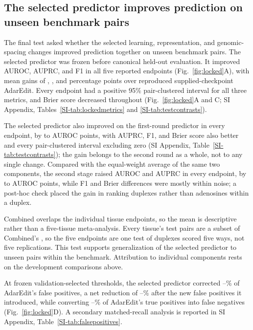 \documentclass[9pt,twocolumn,twoside]{pnas-new}
\newcommand{\SIref}[1]{\ref*{SI-#1}}
\begin{document}
\subsection*{The selected predictor improves prediction on unseen benchmark pairs}

The final test asked whether the selected learning, representation, and genomic-spacing changes improved prediction together on unseen benchmark pairs. The selected predictor was frozen before canonical held-out evaluation. It improved AUROC, AUPRC, and F1 in all five reported endpoints (Fig.~\ref{fig:locked}A), with mean gains of \MacroDeltaAUROCPoints{}, \MacroDeltaAUPRCPoints{}, and \MacroDeltaFOnePoints{} percentage points over reproduced supplied-checkpoint AdarEdit. Every endpoint had a positive 95\% pair-clustered interval for all three metrics, and Brier score decreased throughout (Fig.~\ref{fig:locked}A and C; SI Appendix, Tables~\SIref{tab:lockedmetrics} and \SIref{tab:testcontrasts}).

The selected predictor also improved on the first-round predictor in every endpoint, by \TestVsPNASAUROCMin{} to \TestVsPNASAUROCMax{} AUROC points, with AUPRC, F1, and Brier score also better and every pair-clustered interval excluding zero (SI Appendix, Table~\SIref{tab:testcontrasts}); the gain belongs to the second round as a whole, not to any single change. Compared with the equal-weight average of the same two components, the second stage raised AUROC and AUPRC in every endpoint, by \TestVsEqualAUROCMin{} to \TestVsEqualAUROCMax{} AUROC points, while F1 and Brier differences were mostly within noise; a post-hoc check placed the gain in ranking duplexes rather than adenosines within a duplex.

Combined overlaps the individual tissue endpoints, so the mean is descriptive rather than a five-tissue meta-analysis. Every tissue's test pairs are a subset of Combined's \NTestPairs{}, so the five endpoints are one test of \NTestPairs{} duplexes scored five ways, not five replications. This test supports generalization of the selected predictor to unseen pairs within the benchmark. Attribution to individual components rests on the development comparisons above.

At frozen validation-selected thresholds, the selected predictor corrected \FPRescueRateMin{}--\FPRescueRateMax{}\% of AdarEdit's false positives, a net reduction of \NetFPReductionMin{}--\NetFPReductionMax{}\% after the new false positives it introduced, while converting \TPDamageRateMin{}--\TPDamageRateMax{}\% of AdarEdit's true positives into false negatives (Fig.~\ref{fig:locked}D). A secondary matched-recall analysis is reported in SI Appendix, Table~\SIref{tab:falsepositives}.
\end{document}
